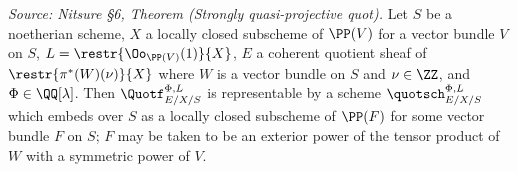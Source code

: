 \begin{theorem}
  \label{thm:strongly-quasiprojective-quot}
  \textit{Source: Nitsure §6, Theorem (Strongly quasi-projective quot).}
  Let $S$ be a noetherian scheme, $X$ a locally closed subscheme of $\PP(V)$ for
  a vector bundle $V$ on $S$, $L = \restr{\Oo_{\PP(V)}(1)}{X}$, $E$ a coherent
  quotient sheaf of $\restr{\pi^*(W)(\nu)}{X}$ where $W$ is a vector bundle on $S$
  and $\nu\in\ZZ$, and $\Phi\in\QQ[\lambda]$. Then $\Quotf_{E/X/S}^{\Phi,L}$ is
  representable by a scheme $\quotsch_{E/X/S}^{\Phi,L}$ which embeds over $S$ as a
  locally closed subscheme of $\PP(F)$ for some vector bundle $F$ on $S$; $F$ may
  be taken to be an exterior power of the tensor product of $W$ with a symmetric
  power of $V$.
\end{theorem}

